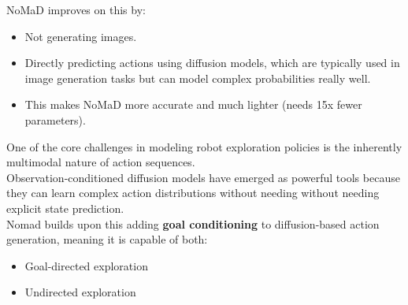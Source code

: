 \documentclass[12pt]{article}
\begin{document}
\begin{appendices}
NoMaD improves on this by:
\begin{itemize}
    \item Not generating images.
    \item Directly predicting actions using diffusion models, which are typically used in image generation tasks but can model complex probabilities really well.
    \item This makes NoMaD more accurate and much lighter (needs 15x fewer parameters).
\end{itemize}
One of the core challenges in modeling robot exploration policies is the inherently multimodal nature of action sequences.\\
Observation-conditioned diffusion models  have emerged as powerful tools because they can learn complex action distributions without needing without needing explicit state prediction.\\
Nomad builds upon this adding \textbf{goal conditioning} to diffusion-based action generation, meaning it is capable of both:
\begin{itemize}
    \item Goal-directed exploration
    \item Undirected exploration 
\end{itemize}


\end{appendices}
\end{document}
